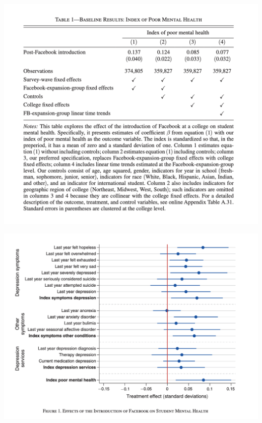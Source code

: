 \documentclass{beamer}
\begin{document}
\begin{frame}
\begin{center}
\includegraphics[scale=0.35]{./lecture_includes/facebook_1}
\end{center}
\end{frame}

\begin{frame}
\begin{center}
\includegraphics[scale=0.35]{./lecture_includes/facebook_2}
\end{center}
\end{frame}
\end{document}
